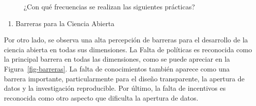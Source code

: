 \documentclass[
  letterpaper,
  DIV=11,
  numbers=noendperiod]{scrreprt}
\providecommand{\tightlist}{%
  \setlength{\itemsep}{0pt}\setlength{\parskip}{0pt}}\usepackage{longtable,booktabs,array}
\begin{document}
\begin{figure}
\begin{minipage}[t]{\linewidth}
{{}

}

\end{minipage}%
\newline
\begin{minipage}[t]{\linewidth}

{\centering 


}

\end{minipage}%

\caption{\label{fig-prac-grid}¿Con qué frecuencias se realizan las
siguientes prácticas?}

\end{figure}

\begin{enumerate}
\def\labelenumi{\alph{enumi})}
\setcounter{enumi}{1}
\tightlist
\item
  Barreras para la Ciencia Abierta
\end{enumerate}

Por otro lado, se observa una alta percepción de barreras para el
desarrollo de la ciencia abierta en todas sus dimensiones. La Falta de
políticas es reconocida como la principal barrera en todas las
dimensiones, como se puede apreciar en la Figura~\ref{fig-barreras}. La
falta de conocimientos también aparece como una barrera importante,
particularmente para el diseño transparente, la apertura de datos y la
investigación reproducible. Por último, la falta de incentivos es
reconocida como otro aspecto que dificulta la apertura de datos.
\end{document}
